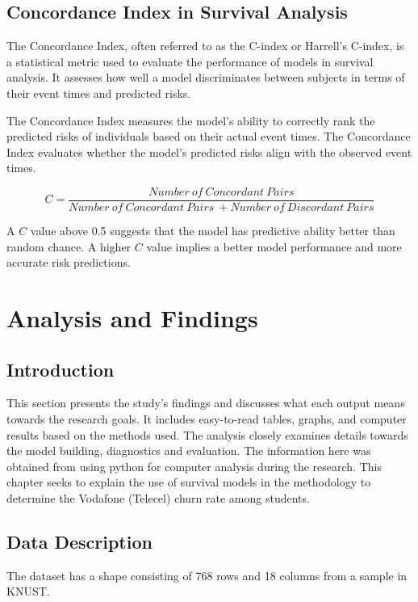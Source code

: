 \documentclass[12pt]{report}
\begin{document}
	\section{Concordance Index in Survival Analysis}
	
	The Concordance Index, often referred to as the C-index or Harrell's C-index, is a statistical metric used to evaluate the performance of models in survival analysis. It assesses how well a model discriminates between subjects in terms of their event times and predicted risks. 
	
	The Concordance Index measures the model's ability to correctly rank the predicted risks of individuals based on their actual event times. The Concordance Index evaluates whether the model's predicted risks align with the observed event times.
	
	\[C=\frac{Number\ of\ Concordant\ Pairs}{Number\ of\ Concordant\ Pairs\ +Number\ of\ Discordant\ Pairs}\]
	
	A \(C\) value above 0.5 suggests that the model has predictive ability better than random chance. A higher \(C\) value implies a better model performance and more accurate risk predictions.
	
	
	
	\newpage
	\chapter{Analysis and Findings}
	\section{Introduction}
	
	This section presents the study's findings and discusses what each output means towards the research goals. It includes easy-to-read tables, graphs, and computer results based on the methods used. The analysis closely examines details towards the model building, diagnostics and evaluation. The information here was obtained from using python for computer analysis during the research. This chapter seeks to explain the use of survival models in the methodology to determine the Vodafone (Telecel) churn rate among students.
	
	\section{Data Description}
	
	The dataset has a shape consisting of 768 rows and 18 columns from a sample in KNUST.
	
\end{document}

